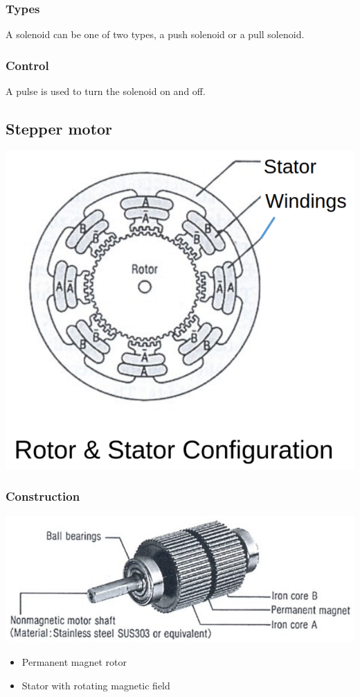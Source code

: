 \documentclass[11pt]{article}
\begin{document}
\subsubsection{Types}
\label{sec:org4156497}
A solenoid can be one of two types, a push solenoid or a pull solenoid.

\subsubsection{Control}
\label{sec:orgfa0bc28}
A pulse is used to turn the solenoid on and off.

\subsection{Stepper motor}
\label{sec:org17a65a3}
\begin{center}
\includegraphics[scale=0.5]{./images/stepper-motor-configuration.png}
\end{center}

\subsubsection{Construction}
\label{sec:orga3c9767}
\begin{center}
\includegraphics[width=.9\linewidth]{./images/stepper-motor-construction.png}
\end{center}
\begin{itemize}
\item Permanent magnet rotor
\item Stator with rotating magnetic field
\end{itemize}
\end{document}
